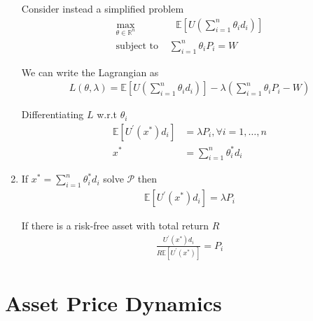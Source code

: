 \documentclass[12pt,twoside]{article}
\begin{document}
\begin{enumerate}
	Consider instead a simplified problem 
		\begin{align*}
			\max_{\theta \in \mathbb{R}^n} 	& \text{ }\mathbb{E} \left[U\left(\sum_{i=1}^n \theta_id_i\right)	 \right]\\
			\text{subject to }							& \sum_{i=1}^n \theta_iP_i = W
		\end{align*}
	
	We can write the Lagrangian as 
		\begin{align*}
			L(\theta, \lambda) = \mathbb{E}\left[U\left(\sum_{i=1}^n \theta_id_i\right) \right] - \lambda \left(\sum_{i=1}^n \theta_i P_i - W\right)
		\end{align*}
		
	Differentiating $L$ w.r.t $\theta_i$
		\begin{align*}
			\mathbb{E} \left[U^\prime (x^*)d_i\right] &= \lambda P_i, \forall i =1,\ldots,n\\
			x^* & = \sum_{i=1}^n \theta_i^*d_i			
		\end{align*}

\item If $x^* = \sum_{i=1}^n \theta_i^* d_i $ solve $\mathcal{P}$ then
	\begin{align*}
		\mathbb{E} \left[U^\prime (x^*) d_i \right] = \lambda P_i
	\end{align*}
	
		If there is a risk-free asset with total return $R$ 
	\begin{align*}
		\frac{U^\prime(x^*)d_i}{R \mathbb{E}\left[U^\prime(x^*)\right]}= P_i
	\end{align*}		
		
	
\end{enumerate}


\section{Asset Price Dynamics}
\end{document}
